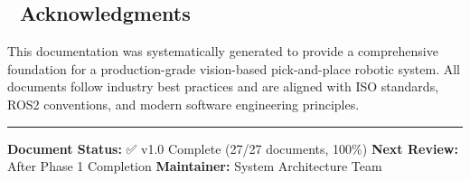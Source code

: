 \documentclass[
]{article}
\begin{document}
\hypertarget{acknowledgments}{%
\subsection{🙏 Acknowledgments}\label{acknowledgments}}

This documentation was systematically generated to provide a
comprehensive foundation for a production-grade vision-based
pick-and-place robotic system. All documents follow industry best
practices and are aligned with ISO standards, ROS2 conventions, and
modern software engineering principles.

\begin{center}\rule{0.5\linewidth}{0.5pt}\end{center}

\textbf{Document Status:} ✅ v1.0 Complete (27/27 documents, 100\%)
\textbf{Next Review:} After Phase 1 Completion \textbf{Maintainer:}
System Architecture Team
\end{document}
